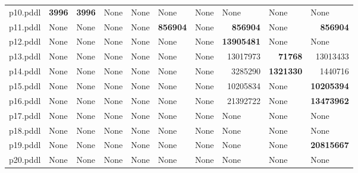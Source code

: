\documentclass{article}
\begin{document}
\begin{tabular}{@{}lrrrrrrrrr@{}}
p10.pddl & \textbf{3996} & \textbf{3996} & \multicolumn{1}{|l|}{None} & \multicolumn{1}{|l|}{None} & \multicolumn{1}{|l|}{None} & \multicolumn{1}{|l|}{None} & \multicolumn{1}{|l|}{None} & \multicolumn{1}{|l|}{None} & \multicolumn{1}{|l|}{None} \\
p11.pddl & \multicolumn{1}{|l|}{None} & \multicolumn{1}{|l|}{None} & \multicolumn{1}{|l|}{None} & \multicolumn{1}{|l|}{None} & \textbf{856904} & \multicolumn{1}{|l|}{None} & \textbf{856904} & \multicolumn{1}{|l|}{None} & \textbf{856904} \\
p12.pddl & \multicolumn{1}{|l|}{None} & \multicolumn{1}{|l|}{None} & \multicolumn{1}{|l|}{None} & \multicolumn{1}{|l|}{None} & \multicolumn{1}{|l|}{None} & \multicolumn{1}{|l|}{None} & \textbf{13905481} & \multicolumn{1}{|l|}{None} & \multicolumn{1}{|l|}{None} \\
p13.pddl & \multicolumn{1}{|l|}{None} & \multicolumn{1}{|l|}{None} & \multicolumn{1}{|l|}{None} & \multicolumn{1}{|l|}{None} & \multicolumn{1}{|l|}{None} & \multicolumn{1}{|l|}{None} & 13017973 & \textbf{71768} & 13013433 \\
p14.pddl & \multicolumn{1}{|l|}{None} & \multicolumn{1}{|l|}{None} & \multicolumn{1}{|l|}{None} & \multicolumn{1}{|l|}{None} & \multicolumn{1}{|l|}{None} & \multicolumn{1}{|l|}{None} & 3285290 & \textbf{1321330} & 1440716 \\
p15.pddl & \multicolumn{1}{|l|}{None} & \multicolumn{1}{|l|}{None} & \multicolumn{1}{|l|}{None} & \multicolumn{1}{|l|}{None} & \multicolumn{1}{|l|}{None} & \multicolumn{1}{|l|}{None} & 10205834 & \multicolumn{1}{|l|}{None} & \textbf{10205394} \\
p16.pddl & \multicolumn{1}{|l|}{None} & \multicolumn{1}{|l|}{None} & \multicolumn{1}{|l|}{None} & \multicolumn{1}{|l|}{None} & \multicolumn{1}{|l|}{None} & \multicolumn{1}{|l|}{None} & 21392722 & \multicolumn{1}{|l|}{None} & \textbf{13473962} \\
p17.pddl & \multicolumn{1}{|l|}{None} & \multicolumn{1}{|l|}{None} & \multicolumn{1}{|l|}{None} & \multicolumn{1}{|l|}{None} & \multicolumn{1}{|l|}{None} & \multicolumn{1}{|l|}{None} & \multicolumn{1}{|l|}{None} & \multicolumn{1}{|l|}{None} & \multicolumn{1}{|l|}{None} \\
p18.pddl & \multicolumn{1}{|l|}{None} & \multicolumn{1}{|l|}{None} & \multicolumn{1}{|l|}{None} & \multicolumn{1}{|l|}{None} & \multicolumn{1}{|l|}{None} & \multicolumn{1}{|l|}{None} & \multicolumn{1}{|l|}{None} & \multicolumn{1}{|l|}{None} & \multicolumn{1}{|l|}{None} \\
p19.pddl & \multicolumn{1}{|l|}{None} & \multicolumn{1}{|l|}{None} & \multicolumn{1}{|l|}{None} & \multicolumn{1}{|l|}{None} & \multicolumn{1}{|l|}{None} & \multicolumn{1}{|l|}{None} & \multicolumn{1}{|l|}{None} & \multicolumn{1}{|l|}{None} & \textbf{20815667} \\
p20.pddl & \multicolumn{1}{|l|}{None} & \multicolumn{1}{|l|}{None} & \multicolumn{1}{|l|}{None} & \multicolumn{1}{|l|}{None} & \multicolumn{1}{|l|}{None} & \multicolumn{1}{|l|}{None} & \multicolumn{1}{|l|}{None} & \multicolumn{1}{|l|}{None} & \multicolumn{1}{|l|}{None} \\
\end{tabular}
\end{document}
